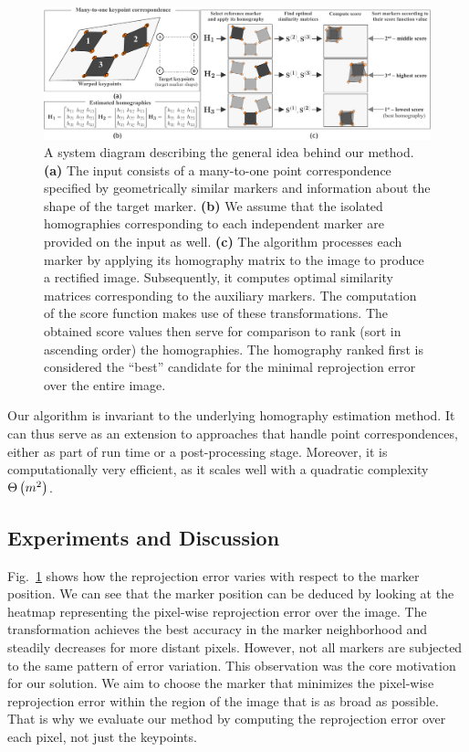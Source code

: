 \begin{figure}[t]
    \centerline{\includegraphics[width=\linewidth]{figures/methodology/system_diagram.pdf}}
    \caption[Homography ranking system diagram]{A system diagram describing the general idea behind our method. \textbf{(a)} The input consists of a many-to-one point correspondence specified by geometrically similar markers and information about the shape of the target marker. \textbf{(b)} We assume that the isolated homographies corresponding to each independent marker are provided on the input as well. \textbf{(c)} The algorithm processes each marker by applying its homography matrix to the image to produce a rectified image. Subsequently, it computes optimal similarity matrices corresponding to the auxiliary markers. The computation of the score function makes use of these transformations. The obtained score values then serve for comparison to rank (sort in ascending order) the homographies. The homography ranked first is considered the ``best'' candidate for the minimal reprojection error over the entire image.}
    \label{fig:HeatmapsBestWorst}
\end{figure}

Our algorithm is invariant to the underlying homography estimation method. It can thus serve as an extension to approaches that handle point correspondences, either as part of run time or a post-processing stage. Moreover, it is computationally very efficient, as it scales well with a quadratic complexity ${\Theta} \left( m^2 \right)$.

\subsection{Experiments and Discussion}

Fig.~\ref{fig:HeatmapsBestWorst} shows how the reprojection error varies with respect to the marker position. We can see that the marker position can be deduced by looking at the heatmap representing the pixel-wise reprojection error over the image. The transformation achieves the best accuracy in the marker neighborhood and steadily decreases for more distant pixels. However, not all markers are subjected to the same pattern of error variation. This observation was the core motivation for our solution. We aim to choose the marker that minimizes the pixel-wise reprojection error within the region of the image that is as broad as possible. That is why we evaluate our method by computing the reprojection error over each pixel, not just the keypoints.

